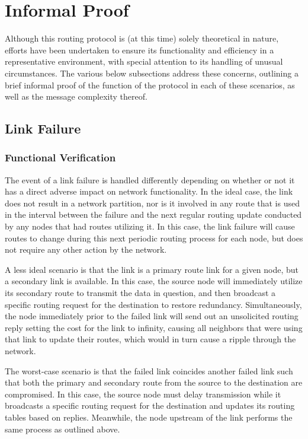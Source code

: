 \section{Informal Proof}\label{sec:informalProof}
Although this routing protocol is (at this time) solely theoretical in nature, efforts have been undertaken to ensure its functionality and efficiency in a representative environment, with special attention to its handling of unusual circumstances. The various below subsections address these concerns, outlining a brief informal proof of the function of the protocol in each of these scenarios, as well as the message complexity thereof.
\subsection{Link Failure}\label{subsec:IPLinkFailure}
\subsubsection{Functional Verification}
The event of a link failure is handled differently depending on whether or not it has a direct adverse impact on network functionality. In the ideal case, the link does not result in a network partition, nor is it involved in any route that is used in the interval between the failure and the next regular routing update conducted by any nodes that had routes utilizing it. In this case, the link failure will cause routes to change during this next periodic routing process for each node, but does not require any other action by the network.

A less ideal scenario is that the link is a primary route link for a given node, but a secondary link is available. In this case, the source node will immediately utilize its secondary route to transmit the data in question, and then broadcast a specific routing request for the destination to restore redundancy. Simultaneously, the node immediately prior to the failed link will send out an unsolicited routing reply setting the cost for the link to infinity, causing all neighbors that were using that link to update their routes, which would in turn cause a ripple through the network.

The worst-case scenario is that the failed link coincides another failed link such that both the primary and secondary route from the source to the destination are compromised. In this case, the source node must delay transmission while it broadcasts a specific routing request for the destination and updates its routing tables based on replies. Meanwhile, the node upstream of the link performs the same process as outlined above.
